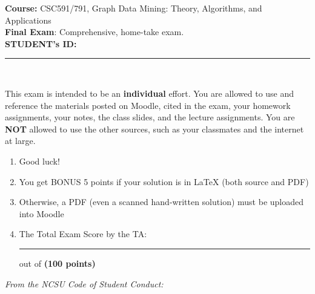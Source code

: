 \documentclass{article}%
\begin{document}
\begin{flushleft}
\textbf{Course:} CSC591/791, Graph Data Mining: Theory, Algorithms, and Applications\\
\textbf{Final Exam}: Comprehensive, home-take exam.\\
\textbf{STUDENT's ID:} \rule{2 in}{1 pt} \\
\end{flushleft}


\noindent{\hrulefill}

\bigskip
This exam is intended to be an \textbf{individual} effort.  You are allowed to use and reference the materials posted on Moodle, cited in the exam, your homework assignments, your notes, the class slides, and the lecture assignments. You are \textbf{NOT} allowed to use the other sources, such as your classmates and the internet at large.

\begin{center}
\begin{enumerate}
	\item Good luck!
	\item You get BONUS 5 points if your solution is in LaTeX (both source and PDF)
	\item Otherwise, a PDF (even a scanned hand-written solution) must be uploaded into Moodle
	\item The Total Exam Score by the TA:  \rule{0.5 in}{1 pt} out of \textbf{(100 points)}
\end{enumerate}
\end{center}

\noindent{\hrulefill}

\bigskip
\textit{From the NCSU Code of Student Conduct:}
\end{document}
